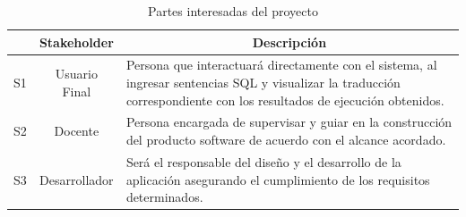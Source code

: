 \begin{table}[H]
    \centering
    \caption{Partes interesadas del proyecto}
    \label{tab:stakeholders}
    \begin{tabular}{|c|c|m{}|}
    \hline
    \rowcolor{gray!50}
    \multicolumn{1}{|c|}{\textbf{ID}} & \multicolumn{1}{c|}{\textbf{Stakeholder}} & \multicolumn{1}{c|}{\textbf{Descripción}} \\
    \hline
    S1 & Usuario Final & Persona que interactuará directamente con el sistema, al ingresar sentencias SQL y visualizar la traducción correspondiente con los resultados de ejecución obtenidos. \\
    \hline
    S2 & Docente & Persona encargada de supervisar y guiar en la construcción del producto software de acuerdo con el alcance acordado.\\
    \hline
    S3 & Desarrollador & Será el responsable del diseño y el desarrollo de la aplicación asegurando el cumplimiento de los requisitos determinados. \\
    \hline
    \end{tabular}
\end{table}